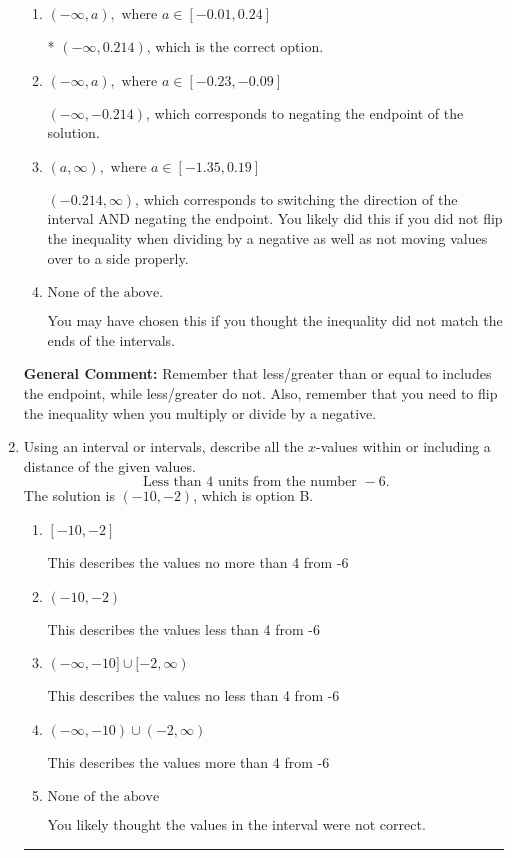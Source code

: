 \documentclass{extbook}[14pt]
\newcommand{\litem}[1]{\item #1

\rule{\textwidth}{0.4pt}}
\begin{document}
\begin{enumerate}
{\begin{enumerate}[label=\Alph*.]
 $(0.214, \infty)$, which corresponds to switching the direction of the interval. You likely did this if you did not flip the inequality when dividing by a negative!
\item \( (-\infty, a), \text{ where } a \in [-0.01, 0.24] \)

* $(-\infty, 0.214)$, which is the correct option.
\item \( (-\infty, a), \text{ where } a \in [-0.23, -0.09] \)

 $(-\infty, -0.214)$, which corresponds to negating the endpoint of the solution.
\item \( (a, \infty), \text{ where } a \in [-1.35, 0.19] \)

 $(-0.214, \infty)$, which corresponds to switching the direction of the interval AND negating the endpoint. You likely did this if you did not flip the inequality when dividing by a negative as well as not moving values over to a side properly.
\item \( \text{None of the above}. \)

You may have chosen this if you thought the inequality did not match the ends of the intervals.
\end{enumerate}

\textbf{General Comment:} Remember that less/greater than or equal to includes the endpoint, while less/greater do not. Also, remember that you need to flip the inequality when you multiply or divide by a negative.
}
\litem{
Using an interval or intervals, describe all the $x$-values within or including a distance of the given values.
\[ \text{ Less than } 4 \text{ units from the number } -6. \]The solution is \( (-10, -2) \), which is option B.\begin{enumerate}[label=\Alph*.]
\item \( [-10, -2] \)

This describes the values no more than 4 from -6
\item \( (-10, -2) \)

This describes the values less than 4 from -6
\item \( (-\infty, -10] \cup [-2, \infty) \)

This describes the values no less than 4 from -6
\item \( (-\infty, -10) \cup (-2, \infty) \)

This describes the values more than 4 from -6
\item \( \text{None of the above} \)

You likely thought the values in the interval were not correct.
\end{enumerate}

}
\end{enumerate}
\end{document}
